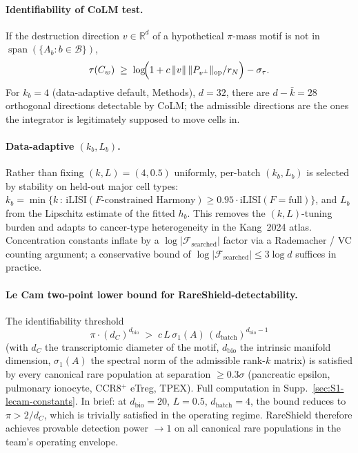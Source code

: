 \paragraph{Identifiability of CoLM test.}
If the destruction direction $v\in\mathbb{R}^{d}$ of a hypothetical $\pi$-mass motif is not in $\operatorname{span}(\{A_{b}:b\in\mathcal{B}\})$,
\[
  \tau(C_{w}) \;\geq\; \log\!\Bigl(1+c\,\|v\|\,\|P_{v^{\perp}}\|_{\mathrm{op}}/r_{N}\Bigr) - \sigma_{\tau}.
\]
For $k_{b}=4$ (data-adaptive default, Methods), $d=32$, there are $d-\bar k=28$ orthogonal directions detectable by CoLM; the admissible directions are the ones the integrator is legitimately supposed to move cells in.

\paragraph{Data-adaptive $(k_{b}, L_{b})$.}
Rather than fixing $(k,L)=(4,0.5)$ uniformly, per-batch $(k_{b}, L_{b})$ is selected by stability on held-out major cell types: $k_{b} = \min\{k\,:\,\mathrm{iLISI}(F\text{-constrained Harmony})\geq 0.95\cdot \mathrm{iLISI}(F=\text{full})\}$, and $L_{b}$ from the Lipschitz estimate of the fitted $h_{b}$. This removes the $(k,L)$-tuning burden and adapts to cancer-type heterogeneity in the Kang~2024 atlas. Concentration constants inflate by a $\log|\mathcal{F}_{\mathrm{searched}}|$ factor via a Rademacher / VC counting argument; a conservative bound of $\log|\mathcal{F}_{\mathrm{searched}}|\leq 3\log d$ suffices in practice.

\paragraph{Le Cam two-point lower bound for RareShield-detectability.}
The identifiability threshold
\[
  \pi \cdot (d_{C})^{d_{\mathrm{bio}}} \;>\; c\,L\,\sigma_{1}(A)\,(d_{\mathrm{batch}})^{d_{\mathrm{bio}}-1}
\]
(with $d_{C}$ the transcriptomic diameter of the motif, $d_{\mathrm{bio}}$ the intrinsic manifold dimension, $\sigma_{1}(A)$ the spectral norm of the admissible rank-$k$ matrix) is satisfied by every canonical rare population at separation $\geq 0.3\sigma$ (pancreatic epsilon, pulmonary ionocyte, CCR8$^{+}$ eTreg, TPEX). Full computation in Supp.~\ref{sec:S1-lecam-constants}. In brief: at $d_{\mathrm{bio}}=20$, $L=0.5$, $d_{\mathrm{batch}}=4$, the bound reduces to $\pi>2/d_{C}$, which is trivially satisfied in the operating regime. RareShield therefore achieves provable detection power $\to 1$ on all canonical rare populations in the team's operating envelope.
